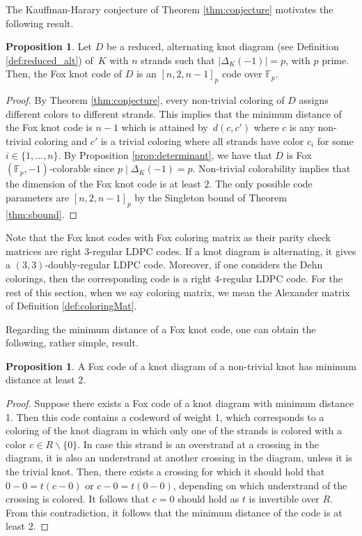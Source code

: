 \documentclass[11pt,a4paper]{article}
\theoremstyle{definition}
\newtheorem{proposition}[theorem]{Proposition}
\newcommand{\numberset}{\mathbb}
\newcommand{\F}{\numberset{F}}
\begin{document}
The Kauffman-Harary conjecture of Theorem \ref{thm:conjecture} motivates the following result.


\begin{proposition}
Let $D$ be a reduced, alternating knot diagram (see Definition \ref{def:reduced_alt}) of~$K$ with $n$ strands such that $|\Delta_K(-1)|=p$, with $p$ prime. Then, the Fox knot code of $D$ is an $[n,2,n-1]_p$ code over $\F_p$.
\end{proposition}



\begin{proof}
By Theorem \ref{thm:conjecture}, every non-trivial coloring of $D$ assigns different colors to different strands. This implies that the minimum distance of the Fox knot code is $n-1$ which is attained by~$d(c,c')$ where $c$ is any non-trivial coloring and $c'$ is a trivial coloring where all strands have color $c_i$ for some $i \in \{1,\ldots,n\}$.  By Proposition \ref{prop:determinant}, we have that $D$ is Fox $(\F_p,-1)$-colorable since $p \mid \Delta_K(-1)=p$. Non-trivial colorability implies that the dimension of the Fox knot code is at least $2$. The only possible code parameters are $[n,2,n-1]_p$ by the Singleton bound of Theorem \ref{thm:sbound}.
\end{proof}

Note that the Fox knot codes with Fox coloring matrix as their parity check matrices are right $3$-regular LDPC codes. If a knot diagram is alternating, it gives a $(3,3)$-doubly-regular LDPC code. Moreover, if one considers the Dehn colorings, then the corresponding code is a right $4$-regular LDPC code. For the rest of this section, when we say coloring matrix, we mean the Alexander matrix of Definition \ref{def:coloringMat}.

Regarding the minimum distance of a Fox knot code, one can obtain the following, rather simple, result.

\begin{proposition}
\label{prop:minimumdistance}
A Fox code of a knot diagram of a non-trivial knot has minimum distance at least 2.
\end{proposition}
\begin{proof}
Suppose there exists a Fox code of a knot diagram with minimum distance 1. Then this code contains a codeword of weight 1, which corresponds to a coloring of the knot diagram in which only one of the strands is colored with a color $c \in R\backslash\{0\}$. In case this strand is an overstrand at a crossing in the diagram, it is also an understrand at another crossing in the diagram, unless it is the trivial knot. Then, there exists a crossing for which it should hold that $0 - 0 = t(c - 0)$ or $c - 0 = t(0 - 0)$, depending on which understrand of the crossing is colored. It follows that $c = 0$ should hold as $t$ is invertible over $R$. From this contradiction, it follows that the minimum distance of the code is at least 2.
\end{proof}
\end{document}
